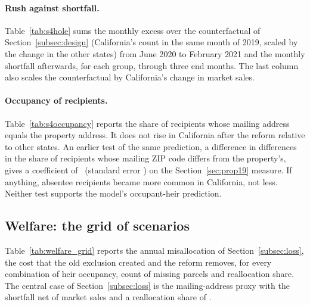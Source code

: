 

\paragraph{Rush against shortfall.} Table~\ref{tab:s4hole} sums the monthly excess over the counterfactual of Section~\ref{subsec:design} (California's count in the same month of 2019, scaled by the change in the other states) from June 2020 to February 2021 and the monthly shortfall afterwards, for each group, through three end months. The last column also scales the counterfactual by California's change in market sales.



\paragraph{Occupancy of recipients.} Table~\ref{tab:s4occupancy} reports the share of recipients whose mailing address equals the property address. It does not rise in California after the reform relative to other states. An earlier test of the same prediction, a difference in differences in the share of recipients whose mailing ZIP code differs from the property's, gives a coefficient of \SIVOldColSixValue\ (standard error \SIVOldColSixSE) on the Section~\ref{sec:prop19} measure. If anything, absentee recipients became more common in California, not less. Neither test supports the model's occupant-heir prediction.



\subsection{Welfare: the grid of scenarios}\label{app:welfaregrid}

Table~\ref{tab:welfare_grid} reports the annual misallocation of Section~\ref{subsec:loss}, the cost that the old exclusion created and the reform removes, for every combination of heir occupancy, count of missing parcels and reallocation share. The central case of Section~\ref{subsec:loss} is the mailing-address proxy with the shortfall net of market sales and a reallocation share of \WViAlpha.




